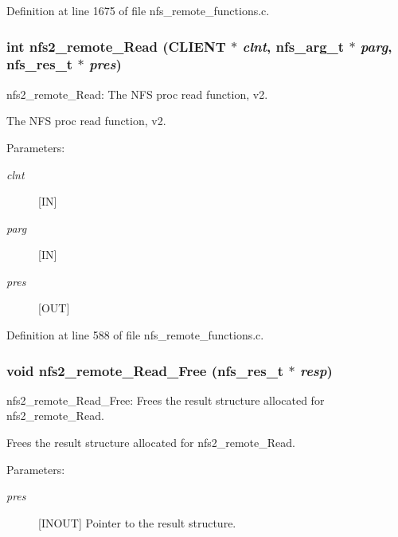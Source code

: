 Definition at line 1675 of file nfs\_\-remote\_\-functions.c.
\subsubsection[{nfs2\_\-remote\_\-Read}]{\setlength{\rightskip}{0pt plus 5cm}int nfs2\_\-remote\_\-Read (CLIENT $\ast$ {\em clnt}, \/  nfs\_\-arg\_\-t $\ast$ {\em parg}, \/  nfs\_\-res\_\-t $\ast$ {\em pres})}\label{group__NFSprocs_gae8a38adaa6d3f96373e48791e285f91}


nfs2\_\-remote\_\-Read: The NFS proc read function, v2.

The NFS proc read function, v2.

\begin{Desc}
\item[Parameters:]
\begin{description}
\item[{\em clnt}][IN] \item[{\em parg}][IN] \item[{\em pres}][OUT] \end{description}
\end{Desc}


Definition at line 588 of file nfs\_\-remote\_\-functions.c.
\subsubsection[{nfs2\_\-remote\_\-Read\_\-Free}]{\setlength{\rightskip}{0pt plus 5cm}void nfs2\_\-remote\_\-Read\_\-Free (nfs\_\-res\_\-t $\ast$ {\em resp})}\label{group__NFSprocs_g927c4395d0af8c46656f39f2be8d9152}


nfs2\_\-remote\_\-Read\_\-Free: Frees the result structure allocated for nfs2\_\-remote\_\-Read.

Frees the result structure allocated for nfs2\_\-remote\_\-Read.

\begin{Desc}
\item[Parameters:]
\begin{description}
\item[{\em pres}][INOUT] Pointer to the result structure. \end{description}
\end{Desc}


